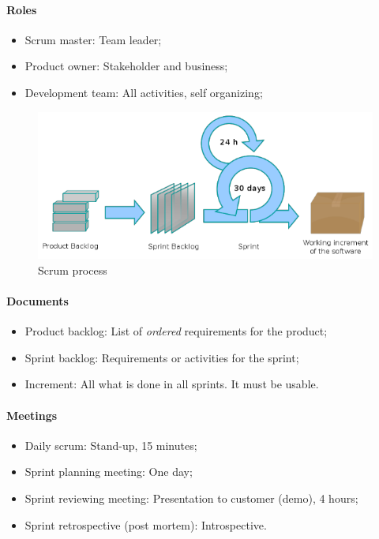 \paragraph{Roles}
\begin{itemize}
\item Scrum master: Team leader;
\item Product owner: Stakeholder and business;
\item Development team: All activities, self organizing;
\end{itemize}

\begin{figure}[hbtp]
\centering
\includegraphics[scale=0.4]{images/scrum_process.png}
\caption{Scrum process}
\end{figure}

\paragraph{Documents}
\begin{itemize}
\item Product backlog: List of \emph{ordered} requirements for the product;
\item Sprint backlog: Requirements or activities for the sprint;
\item Increment: All what is done in all sprints. It must be usable.
\end{itemize}

\paragraph{Meetings}
\begin{itemize}
\item Daily scrum: Stand-up, 15 minutes;
\item Sprint planning meeting: One day;
\item Sprint reviewing meeting: Presentation to customer (demo), 4 hours;
\item Sprint retrospective (post mortem): Introspective.
\end{itemize}

